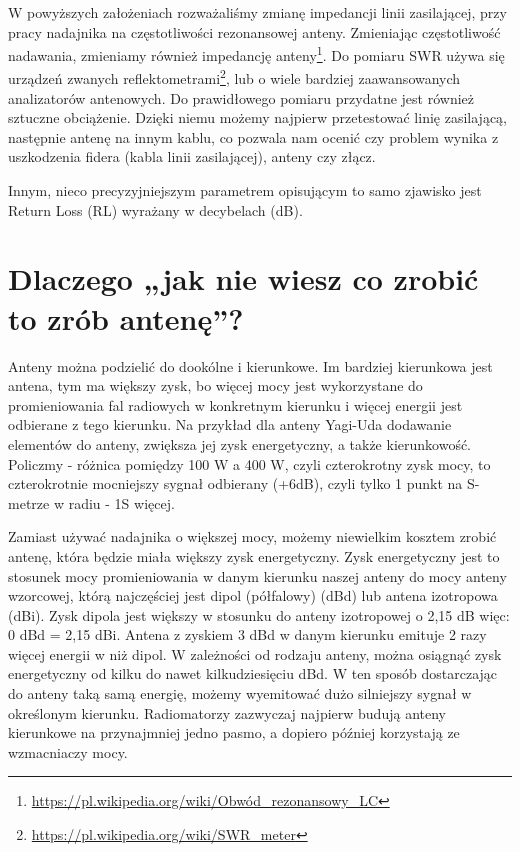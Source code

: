 \documentclass[a4paper,12pt]{article}
\begin{document}
W powyższych założeniach rozważaliśmy zmianę impedancji linii zasilającej, przy pracy nadajnika na częstotliwości rezonansowej anteny. Zmieniając częstotliwość nadawania, zmieniamy również impedancję anteny\footnote{\url{https://pl.wikipedia.org/wiki/Obwód_rezonansowy_LC}}.
Do pomiaru SWR używa się urządzeń zwanych reflektometrami\footnote{\url{https://pl.wikipedia.org/wiki/SWR_meter}}, lub o wiele bardziej zaawansowanych analizatorów antenowych.
Do prawidłowego pomiaru przydatne jest również sztuczne obciążenie. Dzięki niemu możemy najpierw przetestować linię zasilającą, następnie antenę na innym kablu, co pozwala nam ocenić czy problem wynika z uszkodzenia fidera (kabla linii zasilającej), anteny czy złącz.

Innym, nieco precyzyjniejszym parametrem opisującym to samo zjawisko jest Return Loss (RL) wyrażany w decybelach (dB).

\section{Dlaczego „jak nie wiesz co zrobić to zrób antenę”?}
Anteny można podzielić do dookólne i kierunkowe. Im bardziej kierunkowa jest antena, tym ma większy zysk, bo więcej mocy jest wykorzystane do promieniowania fal radiowych w konkretnym kierunku i więcej energii jest odbierane z tego kierunku. Na przykład dla anteny Yagi-Uda dodawanie elementów do anteny, zwiększa jej zysk energetyczny, a także kierunkowość.
Policzmy - różnica pomiędzy 100 W a 400 W, czyli czterokrotny zysk mocy, to czterokrotnie mocniejszy sygnał odbierany (+6dB), czyli tylko 1 punkt na S-metrze w radiu - 1S więcej.

Zamiast używać nadajnika o większej mocy, możemy niewielkim kosztem zrobić antenę, która będzie miała większy zysk energetyczny. Zysk energetyczny jest to stosunek mocy promieniowania w danym kierunku naszej anteny do mocy anteny wzorcowej, którą najczęściej jest dipol (półfalowy) (dBd) lub antena izotropowa (dBi). Zysk dipola jest większy w stosunku do anteny izotropowej o 2,15 dB więc: 0 dBd = 2,15 dBi. Antena z zyskiem 3 dBd w danym kierunku emituje 2 razy więcej energii w niż dipol. W zależności od rodzaju anteny, można osiągnąć zysk energetyczny od kilku do nawet kilkudziesięciu dBd. W ten sposób dostarczając do anteny taką samą energię, możemy wyemitować dużo silniejszy sygnał w określonym kierunku. Radiomatorzy zazwyczaj najpierw budują anteny kierunkowe na przynajmniej jedno pasmo, a dopiero później korzystają ze wzmacniaczy mocy.
\end{document}
